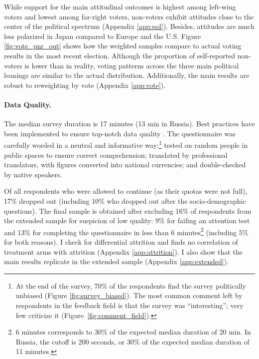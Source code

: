 \documentclass[12pt,english]{article}
\begin{document}
\begin{bibunit}
While support for the main attitudinal outcomes 
is highest among left-wing voters and lowest among far-right voters, non-voters exhibit attitudes close to the center of the political spectrum (Appendix \ref{app:pol}). Besides, attitudes are much less polarized in Japan compared to Europe and the U.S. 
Figure \ref{fig:vote_pnr_out} shows 
how the weighted samples compare to actual voting results in the most recent election. 
Although the proportion of self-reported non-voters is lower than in reality, voting patterns across the three main political leanings are similar to the actual distribution. 
Additionally, the main results are robust to reweighting by vote (Appendix \ref{app:vote}). 

\paragraph{Data Quality.}\label{par:data_quality}
The median survey duration is 17 minutes (13 min in Russia). 
Best practices have been implemented  to ensure top-notch data quality \citep{stantcheva_how_2023}. 
The questionnaire was carefully worded in a neutral and informative way;\footnote{At the end of the survey, 70\% of the respondents find the survey politically unbiased (Figure \ref{fig:survey_biased}). The most common comment left by respondents in the feedback field is that the survey was ``interesting''; very few criticize it (Figure~\ref{fig:comment_field}).} tested on random people in public spaces to ensure correct comprehension; translated by professional translators, with figures converted into national currencies; and double-checked by native speakers.

Of all respondents who %
were allowed to continue (as their quotas were not full), %
17\% dropped out (including 10\% who dropped out after the socio-demographic questions). The final sample is obtained after excluding 16\% of respondents from the extended sample for suspicion of low quality: 9\% for failing an attention test and 13\% for completing the questionnaire in less than 6 minutes\footnote{6 minutes corresponds to 30\% of the expected median duration of 20 min. In Russia, the cutoff is 200 seconds, or 30\% of the expected median duration of 11 minutes.} (including 5\% for both reasons). 
I check for differential attrition and finds no correlation of treatment arms with attrition (Appendix \ref{app:attrition}). I also show that the main results replicate in the extended sample (Appendix \ref{app:extended}). 


\end{bibunit}
\end{document}

